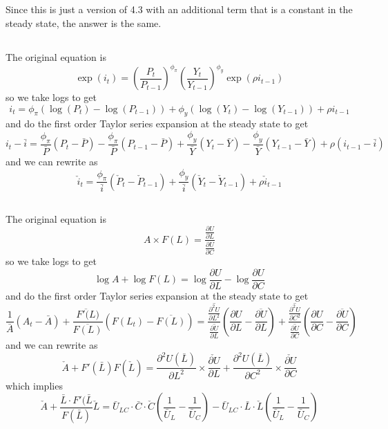 \documentclass[11pt]{amsart}
\begin{document}
\subsection{}

Since this is just a version of 4.3 with an additional term that is a constant in the steady state, the answer is the same.

\subsection{}
The original equation is
\[
\exp(i_t) = \left(\frac{P_t}{P_{t-1}} \right)^{\phi_{\pi}} \left(\frac{Y_t}{Y_{t-1}} \right)^{\phi_y} \exp(\rho i_{t-1})
\]
so we take logs to get
\[
i_t = \phi_{\pi}(\log(P_t) - \log(P_{t-1})) + \phi_y (\log(Y_t) - \log(Y_{t-1})) + \rho i_{t-1}
\]
and do the first order Taylor series expansion at the steady state to get
\[
i_t - \bar{i} = \frac{\phi_{\pi}}{\bar{P}} (P_t - \bar{P}) - \frac{\phi_{\pi}}{\bar{P}} (P_{t-1} - \bar{P}) +\frac{\phi_y}{\bar{Y}} (Y_t - \bar{Y}) - \frac{\phi_y}{\bar{Y}} (Y_{t-1} - \bar{Y}) + \rho(i_{t-1} - \bar{i})
\]
and we can rewrite as
\[
\check{i}_t = \frac{\phi_{\pi}}{\bar{i}} (\check{P}_t - \check{P}_{t-1})  +\frac{\phi_y}{\bar{i}} (\check{Y}_t - \check{Y}_{t-1}) + \rho \check{i}_{t-1}
\]

\subsection{}

The original equation is
\[
A \times F(L) = \frac{\frac{\partial U}{\partial L}}{\frac{\partial U}{\partial C}}
\]
so we take logs to get
\[
\log A + \log F(L) = \log \frac{\partial U}{\partial L} - \log \frac{\partial U}{\partial C}
\]
and do the first order Taylor series expansion at the steady state to get
\[
\frac{1}{\bar{A}} (A_t - \bar{A}) + \frac{\overline{F'(L})}{\overline{F(L)}} (F(L_t) - \overline{F(L)}) = \frac{\overline{\frac{\partial^2 U}{\partial L^2} }}{\overline{\frac{\partial U}{\partial L} }} (\frac{\partial U}{\partial L} - \overline{\frac{\partial U}{\partial L} }) + \frac{\overline{\frac{\partial^2 U}{\partial C^2} }}{\overline{\frac{\partial U}{\partial C} }} (\frac{\partial U}{\partial C} - \overline{\frac{\partial U}{\partial C} })
\]
and we can rewrite as
\[
\check{A} + F'(\bar{L})F(\check{L}) = \frac{\partial^2 U(\bar{L})}{\partial L^2} \times \check{\frac{\partial U}{\partial L}} +  \frac{\partial^2 U(\bar{L})}{\partial C^2} \times \check{\frac{\partial U}{\partial C}}
\]
which implies
\[
\check{A} + \frac{\bar{L} \cdot F'(\bar{L}}{F(\bar{L})} \check{L} = \bar{U}_{LC} \cdot \bar{C} \cdot \check{C} \left( \frac{1}{\bar{U}_L} - \frac{1}{\bar{U}_C} \right) - \bar{U}_{LC} \cdot \bar{L} \cdot \check{L} \left( \frac{1}{\bar{U}_L} - \frac{1}{\bar{U}_C} \right)
\]
\end{document}
